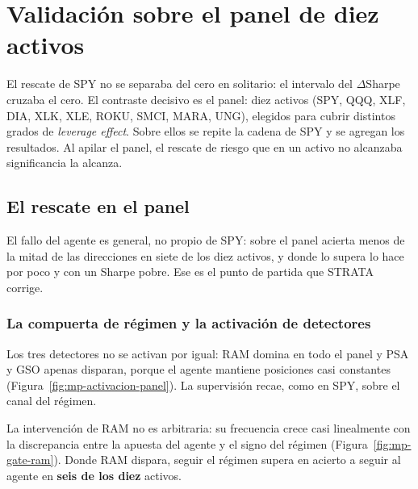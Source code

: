 \chapter{Validación sobre el panel de diez activos}
\label{cap:panel}


El rescate de SPY no se separaba del cero en solitario: el intervalo del $\Delta$Sharpe cruzaba el cero. El contraste decisivo es el panel: diez activos (SPY, QQQ, XLF, DIA, XLK, XLE, ROKU, SMCI, MARA, UNG), elegidos para cubrir distintos grados de \emph{leverage effect}. Sobre ellos se repite la cadena de SPY y se agregan los resultados. Al apilar el panel, el rescate de riesgo que en un activo no alcanzaba significancia la alcanza.

\section{El rescate en el panel}
\label{sec:panel-agregado}

El fallo del agente es general, no propio de SPY: sobre el panel acierta menos de la mitad de las direcciones en siete de los diez activos, y donde lo supera lo hace por poco y con un Sharpe pobre. Ese es el punto de partida que STRATA corrige.

\subsection{La compuerta de régimen y la activación de detectores}
\label{sec:panel-gate}

Los tres detectores no se activan por igual: RAM domina en todo el panel y PSA y GSO apenas disparan, porque el agente mantiene posiciones casi constantes (Figura~\ref{fig:mp-activacion-panel}). La supervisión recae, como en SPY, sobre el canal del régimen.

La intervención de RAM no es arbitraria: su frecuencia crece casi linealmente con la discrepancia entre la apuesta del agente y el signo del régimen (Figura~\ref{fig:mp-gate-ram}). Donde RAM dispara, seguir el régimen supera en acierto a seguir al agente en \textbf{seis de los diez} activos.

